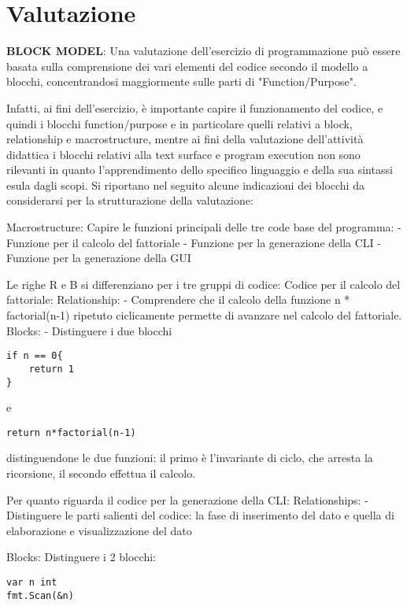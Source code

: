 \section{Valutazione}
\textbf{BLOCK MODEL}:
Una valutazione dell'esercizio di programmazione può essere basata sulla comprensione dei vari elementi del codice secondo il modello a blocchi, concentrandosi maggiormente sulle parti di "Function/Purpose".

Infatti, ai fini dell'esercizio, è importante capire il funzionamento del codice, e quindi i blocchi function/purpose e in particolare quelli relativi a block, relationship e macrostructure, mentre ai fini della valutazione dell'attività didattica i blocchi relativi alla text surface e program execution non sono rilevanti in quanto l'apprendimento dello specifico linguaggio e della sua sintassi esula dagli scopi.
Si riportano nel seguito alcune indicazioni dei blocchi da considerarsi per la strutturazione della valutazione:

Macrostructure:
Capire le funzioni principali delle tre code base del programma:
- Funzione per il calcolo del fattoriale
- Funzione per la generazione della CLI
- Funzione per la generazione della GUI

Le righe R e B si differenziano per i tre gruppi di codice:
Codice per il calcolo del fattoriale:
Relationship:
- Comprendere che il calcolo della funzione n * factorial(n-1) ripetuto ciclicamente permette di avanzare nel calcolo del fattoriale.
Blocks:
- Distinguere i due blocchi

\begin{lstlisting}
if n == 0{
    return 1
}
\end{lstlisting}

e

\begin{lstlisting}
return n*factorial(n-1)
\end{lstlisting}

distinguendone le due funzioni: il primo è l'invariante di ciclo, che arresta la ricorsione, il secondo effettua il calcolo.

Per quanto riguarda il codice per la generazione della CLI:
Relationships:
- Distinguere le parti salienti del codice: la fase di inserimento del dato e quella di elaborazione e visualizzazione del dato

Blocks:
Distinguere i 2 blocchi:

\begin{lstlisting}
var n int
fmt.Scan(&n)
\end{lstlisting}

